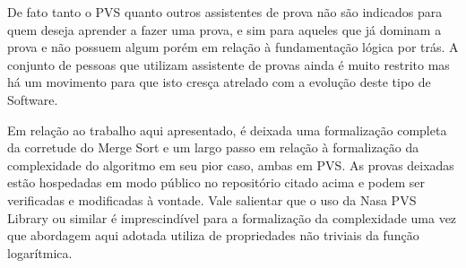 \documentclass[12pt]{article}
\theoremstyle{definition}
\begin{document}
De fato tanto o PVS quanto outros assistentes de prova não são indicados para quem deseja aprender a fazer uma prova,
e sim para aqueles que já dominam a prova e não possuem algum porém em relação à fundamentação lógica por trás.
A conjunto de pessoas que utilizam assistente de provas ainda é muito restrito mas há um movimento para que isto cresça
atrelado com a evolução deste tipo de Software.

Em relação ao trabalho aqui apresentado, é deixada uma formalização completa da corretude do Merge Sort e um largo passo
em relação à formalização da complexidade do algoritmo em seu pior caso, ambas em PVS. As provas deixadas estão hospedadas
em modo público no repositório citado acima e podem ser verificadas e modificadas à vontade. Vale salientar que o uso
da Nasa PVS Library ou similar é imprescindível para a formalização da complexidade uma vez que abordagem aqui adotada utiliza
de propriedades não triviais da função logarítmica.


\end{document}
